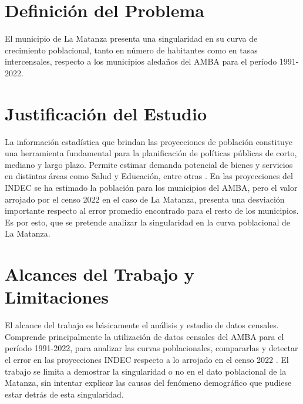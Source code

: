 \documentclass{article}
\theoremstyle{mytheoremstyle}
\theoremstyle{mytheoremstyle}
\theoremstyle{myproblemstyle}
\begin{document}
\section{Definición del Problema }
El municipio de La Matanza presenta una singularidad en su curva de crecimiento poblacional, tanto en número de habitantes como en tasas intercensales, respecto a los 
municipios aledaños del AMBA para el período 1991-2022.

\section{Justificación del Estudio}
La información estadística que brindan las proyecciones de población constituye una herramienta fundamental
 para la planificación de políticas públicas de corto, mediano y largo plazo. 
 Permite estimar demanda potencial de bienes y servicios en distintas áreas como Salud y Educación, entre otras .\newline\newline
En las proyecciones del INDEC  se  ha estimado la población para los municipios del AMBA, pero el valor
 arrojado por el censo 2022 en el caso de La Matanza, presenta una desviación importante respecto 
 al error promedio encontrado para el resto de los municipios. Es por esto, que se pretende analizar la 
 singularidad en la curva poblacional de La Matanza.

\section{ Alcances del Trabajo y Limitaciones}
El alcance del trabajo es básicamente el análisis y estudio de datos censales. Comprende principalmente la utilización de 
datos censales del AMBA para el período 1991-2022, para analizar las curvas poblacionales, 
compararlas y detectar el error en las proyecciones INDEC respecto a lo arrojado en el censo 2022 .
 El trabajo se limita a demostrar la singularidad o no en el dato poblacional de la Matanza,
  sin intentar explicar las causas del fenómeno demográfico que pudiese estar detrás de esta singularidad.
\end{document}
